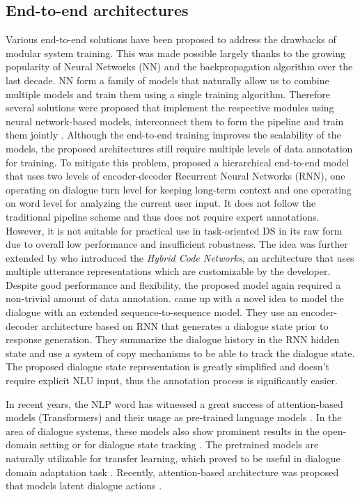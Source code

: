 \subsection{End-to-end architectures}
\label{relwork:end-to-end}
Various end-to-end solutions have been proposed to address the drawbacks of modular system training.
This was made possible largely thanks to the growing popularity of Neural Networks (NN) and the backpropagation algorithm over the last decade.
NN form a family of models that naturally allow us to combine multiple models and train them using a single training algorithm.
Therefore several solutions were proposed that implement the respective modules using neural network-based models, interconnect them to form the pipeline and train them jointly \cite{li-etal-2017-end,wen-etal-2017-network}.
Although the end-to-end training improves the scalability of the models, the proposed architectures still require multiple levels of data annotation for training.
To mitigate this problem, \citet{serban2016building} proposed a hierarchical end-to-end model that uses two levels of encoder-decoder Recurrent Neural Networks (RNN), one operating on dialogue turn level for keeping long-term context and one operating on word level for analyzing the current user input.
It does not follow the traditional pipeline scheme and thus does not require expert annotations.
However, it is not suitable for practical use in task-oriented DS in its raw form due to overall low performance and insufficient robustness.
The idea was further extended by \citet{williams2017hybrid} who introduced the \textit{Hybrid Code Networks}, an architecture that uses multiple utterance representations which are customizable by the developer.
Despite good performance and flexibility, the proposed model again required a non-trivial amount of data annotation.
\citet{lei2018sequicity} came up with a novel idea to model the dialogue with an extended sequence-to-sequence model.
\label{sec:sequicity}
They use an encoder-decoder architecture based on RNN that generates a dialogue state prior to response generation.
They summarize the dialogue history in the RNN hidden state and use a system of copy mechanisms to be able to track the dialogue state.
The proposed dialogue state representation is greatly simplified and doesn't require explicit NLU input, thus the annotation process is significantly easier.

In recent years, the NLP word has witnessed a great success of attention-based models (Transformers) \cite{vaswani2017attention} and their usage as pre-trained language models \cite{devlin-etal-2019-bert}.
In the area of dialogue systems, these models also show prominent results in the open-domain setting \cite{DBLP:journals/corr/abs-1901-08149} or for dialogue state tracking \cite{chao2019bert}.
The pretrained models are naturally utilizable for transfer learning, which proved to be useful in dialogue domain adaptation task \cite{shalyminov-etal-2019-shot}.
Recently, attention-based architecture was proposed that models latent dialogue actions \cite{bao2019plato}.
\
